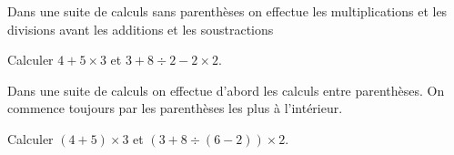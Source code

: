 \documentclass[12pt,a4paper]{article}
\begin{document}
\begin{myprop}
	Dans une suite de calculs sans parenthèses on effectue les multiplications et les divisions avant les additions et les soustractions
\end{myprop}

\begin{myexs}
	Calculer $4 + 5 \times 3$ et $3 + 8 \div 2 - 2 \times 2$.\\
	
	\iftoggle{eleve}{%
		
		\vspace*{2cm}
		
	}{%
		\begin{itemize}[label=\textbullet]
			\item $4 + 5 \times 3 = 4 + 15 = 19$ \\
			
			
			\item $ 3 + 8 \div 2 - 2 \times 2 = 3 + 4 - 4 = 3 $
		\end{itemize}
		
		
		
		
	}
\end{myexs}



\begin{myprop}
	Dans une suite de calculs on effectue d'abord les calculs entre parenthèses. On commence toujours par les parenthèses les plus à l'intérieur.
\end{myprop}

\begin{myexs}
	Calculer $(4 + 5) \times 3$ et $(3 + 8 \div (6 - 2)) \times 2$.\\
	
	\iftoggle{eleve}{%
		
		\vspace*{2cm}
		
	}{%
		\begin{itemize}[label=\textbullet]
			\item $(4 + 5) \times 3 = 9 \times 3 = 27$ \\
			
			
			\item $ (3 + 8 \div (6 - 2)) \times 2 = (3 + 8 \div 4) \times 2 = (3 + 2) \times 2 = 5 \times 2 = 10$
		\end{itemize}	
		
	}
\end{myexs}
\end{document}
